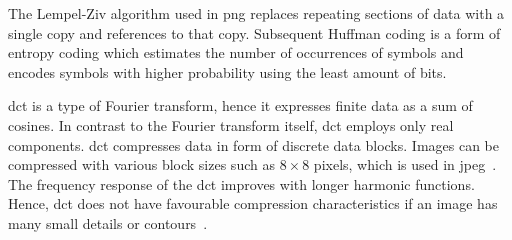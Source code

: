 The Lempel-Ziv algorithm used in \gls{png} replaces repeating sections of data with a single copy and references to that copy. Subsequent Huffman coding is a form of entropy coding which estimates the number of occurrences of symbols and encodes symbols with higher probability using the least amount of bits.

\Gls{dct} is a type of Fourier transform, hence it expresses finite data as a sum of cosines. In contrast to the Fourier transform itself, \gls{dct} employs only real components. \Gls{dct} compresses data in form of discrete data blocks. Images can be compressed with various block sizes such as $8\times8$ pixels, which is used in \gls{jpeg}~\cite{Bocharova2009CompressionMultimedia}. The frequency response of the \gls{dct} improves with longer harmonic functions. Hence, \gls{dct} does not have favourable compression characteristics if an image has many small details or contours~\cite{Bocharova2009CompressionMultimedia}.

